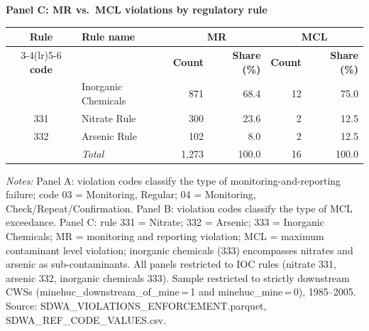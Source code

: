 \begin{table}[htbp]
\noindent\textbf{Panel C: MR vs.~MCL violations by regulatory rule} \\[4pt]
\begin{tabular}{clrrrr}
\hline\hline
\textbf{Rule} & \textbf{Rule name} & \multicolumn{2}{c}{\textbf{MR}} & \multicolumn{2}{c}{\textbf{MCL}} \\
\cmidrule(lr){3-4}\cmidrule(lr){5-6}
\textbf{code} & & \textbf{Count} & \textbf{Share (\%)} & \textbf{Count} & \textbf{Share (\%)} \\
\hline
\addlinespace[2pt]
333 & Inorganic Chemicals & 871 & 68.4 & 12 & 75.0 \\
331 & Nitrate Rule & 300 & 23.6 & 2 & 12.5 \\
332 & Arsenic Rule & 102 & 8.0 & 2 & 12.5 \\
\addlinespace[2pt]
\hline
  & \textit{Total} & 1,273 & 100.0 & 16 & 100.0 \\
\hline\hline
\end{tabular}
\begin{minipage}{\linewidth}
\vspace{4pt}
\footnotesize
\textit{Notes:} Panel A: violation codes classify the type of monitoring-and-reporting failure; code 03 = Monitoring, Regular; 04 = Monitoring, Check/Repeat/Confirmation. Panel B: violation codes classify the type of MCL exceedance. Panel C: rule 331 = Nitrate; 332 = Arsenic; 333 = Inorganic Chemicals; MR = monitoring and reporting violation; MCL = maximum contaminant level violation; inorganic chemicals (333) encompasses nitrates and arsenic as sub-contaminants. All panels restricted to IOC rules (nitrate 331, arsenic 332, inorganic chemicals 333). Sample restricted to strictly downstream CWSs (minehuc\_downstream\_of\_mine\,=\,1 and minehuc\_mine\,=\,0), 1985--2005. Source: SDWA\_VIOLATIONS\_ENFORCEMENT.parquet, SDWA\_REF\_CODE\_VALUES.csv.
\end{minipage}
\end{table}
